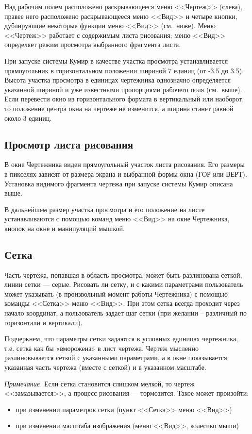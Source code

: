 Над рабочим полем расположено раскрывающееся меню <<Чертеж>> (слева), правее него расположено раскрывающееся меню <<Вид>> и четыре кнопки, дублирующие некоторые функции меню <<Вид>> (см.~ниже). Меню <<Чертеж>> работает с содержимым листа рисования; меню <<Вид>> определяет режим просмотра выбранного фрагмента листа.

При запуске системы Кумир в качестве участка просмотра устанавливается  прямоугольник в горизонтальном положении шириной  7 единиц (от -3.5 до 3.5).  Высота участка просмотра в единицах чертежника однозначно определяется указанной шириной и уже известными пропорциями рабочего поля (см.~выше).  Если перевести окно из горизонтального формата в вертикальный или наоборот, то положение центра окна на чертеже не изменится, а ширина станет равной около 3 единиц.

\subsection{Просмотр листа рисования}

	В окне Чертежника виден прямоугольный участок листа рисования. Его размеры в пикселях зависят от размера экрана и выбранной формы окна (ГОР или ВЕРТ).  Установка видимого фрагмента чертежа при запуске системы Кумир описана выше.

В дальнейшем размер участка просмотра и его положение на листе устанавливаются с помощью команд меню <<Вид>> на окне Чертежника, кнопок на окне и манипуляций мышкой.

\subsection{Сетка}
\label{drawsetka}

Часть чертежа, попавшая в область просмотра, может быть разлинована сеткой, линии сетки --- серые. Рисовать ли сетку, и с какими параметрами пользователь может указывать (в произвольный момент работы Чертежника) с помощью команды <<Сетка>> меню <<Вид>>. При этом сетка всегда проходит через начало координат, а пользователь задает шаг сетки (при желании -- различный по горизонтали и вертикали).

Подчеркнем, что параметры сетки задаются в условных единицах чертежника, т.е. сетка как бы «вморожена» в лист чертежа. Чертеж мысленно разлиновывается сеткой с указанными параметрами, а в окне показывается указанная часть чертежа (вместе с сеткой) и в указанном масштабе.

\emph{Примечание.} Если сетка становится слишком мелкой, то чертеж <<замазывается>>, а процесс рисования --- тормозится. Такое может произойти:
\begin{itemize}
\item при изменении параметров сетки (пункт <<Сетка>> меню <<Вид>>)
\item при изменении масштаба изображения (меню <<Вид>>, колесико мыши)
\end{itemize}

